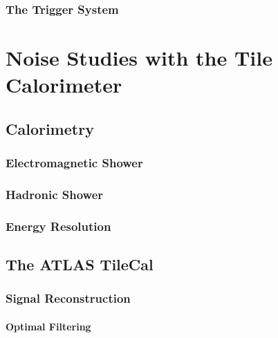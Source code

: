 \documentclass[10pt,twoside,cucitura,classica,english,openany]{toptesi}
\begin{document}
\subsection{The Trigger System}
\label{sec:trigger-system}



\chapter{Noise Studies with the Tile Calorimeter}
\label{cha:noise-studies-with}

\section{Calorimetry}
\label{sec:calorimetry}



\subsection{Electromagnetic Shower}
\label{sec:electr-show}



\subsection{Hadronic Shower}
\label{sec:hadronic-shower}



\subsection{Energy Resolution}
\label{sec:energy-resolution}



\section{The ATLAS TileCal}
\label{sec:atlas-tilecal}



\subsection{Signal Reconstruction}
\label{sec:sign-reconstr}



\subsubsection{Optimal Filtering}
\label{sec:optimal-filtering}
\end{document}
